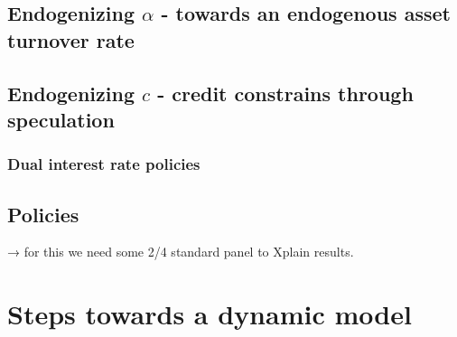 \documentclass{article}
\begin{document}
\subsection{Endogenizing $\alpha$ - towards an endogenous asset turnover rate}

\subsection{Endogenizing $c$ - credit constrains through speculation}
\subsubsection{Dual interest rate policies}

\subsection{Policies}
→ for this we need some 2/4 standard panel to Xplain results.

\section{Steps towards a dynamic model}
\end{document}
